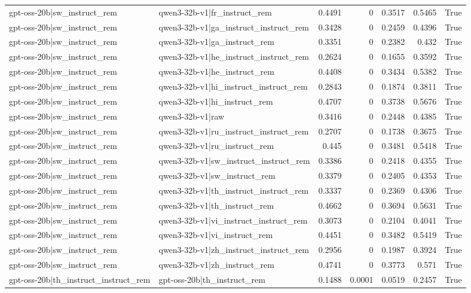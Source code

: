 \begin{table}
\begin{tabular}{l l r r r r l}
gpt-oss-20b|sw_instruct_rem & qwen3-32b-v1|fr_instruct_rem & 0.4491 & 0 & 0.3517 & 0.5465 & True \\
gpt-oss-20b|sw_instruct_rem & qwen3-32b-v1|ga_instruct_instruct_rem & 0.3428 & 0 & 0.2459 & 0.4396 & True \\
gpt-oss-20b|sw_instruct_rem & qwen3-32b-v1|ga_instruct_rem & 0.3351 & 0 & 0.2382 & 0.432 & True \\
gpt-oss-20b|sw_instruct_rem & qwen3-32b-v1|he_instruct_instruct_rem & 0.2624 & 0 & 0.1655 & 0.3592 & True \\
gpt-oss-20b|sw_instruct_rem & qwen3-32b-v1|he_instruct_rem & 0.4408 & 0 & 0.3434 & 0.5382 & True \\
gpt-oss-20b|sw_instruct_rem & qwen3-32b-v1|hi_instruct_instruct_rem & 0.2843 & 0 & 0.1874 & 0.3811 & True \\
gpt-oss-20b|sw_instruct_rem & qwen3-32b-v1|hi_instruct_rem & 0.4707 & 0 & 0.3738 & 0.5676 & True \\
gpt-oss-20b|sw_instruct_rem & qwen3-32b-v1|raw & 0.3416 & 0 & 0.2448 & 0.4385 & True \\
gpt-oss-20b|sw_instruct_rem & qwen3-32b-v1|ru_instruct_instruct_rem & 0.2707 & 0 & 0.1738 & 0.3675 & True \\
gpt-oss-20b|sw_instruct_rem & qwen3-32b-v1|ru_instruct_rem & 0.445 & 0 & 0.3481 & 0.5418 & True \\
gpt-oss-20b|sw_instruct_rem & qwen3-32b-v1|sw_instruct_instruct_rem & 0.3386 & 0 & 0.2418 & 0.4355 & True \\
gpt-oss-20b|sw_instruct_rem & qwen3-32b-v1|sw_instruct_rem & 0.3379 & 0 & 0.2405 & 0.4353 & True \\
gpt-oss-20b|sw_instruct_rem & qwen3-32b-v1|th_instruct_instruct_rem & 0.3337 & 0 & 0.2369 & 0.4306 & True \\
gpt-oss-20b|sw_instruct_rem & qwen3-32b-v1|th_instruct_rem & 0.4662 & 0 & 0.3694 & 0.5631 & True \\
gpt-oss-20b|sw_instruct_rem & qwen3-32b-v1|vi_instruct_instruct_rem & 0.3073 & 0 & 0.2104 & 0.4041 & True \\
gpt-oss-20b|sw_instruct_rem & qwen3-32b-v1|vi_instruct_rem & 0.4451 & 0 & 0.3482 & 0.5419 & True \\
gpt-oss-20b|sw_instruct_rem & qwen3-32b-v1|zh_instruct_instruct_rem & 0.2956 & 0 & 0.1987 & 0.3924 & True \\
gpt-oss-20b|sw_instruct_rem & qwen3-32b-v1|zh_instruct_rem & 0.4741 & 0 & 0.3773 & 0.571 & True \\
gpt-oss-20b|th_instruct_instruct_rem & gpt-oss-20b|th_instruct_rem & 0.1488 & 0.0001 & 0.0519 & 0.2457 & True \\

\end{tabular}
\end{table}
